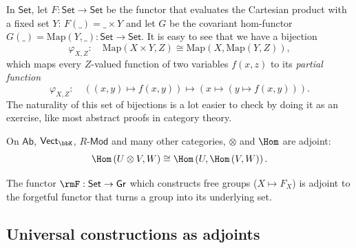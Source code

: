\begin{example}
In $\mathsf{Set}$, let $F:\mathsf{Set}\to\mathsf{Set}$ be the functor
that evaluates the Cartesian product with a fixed set $Y$: $F\left(\_\right)=\_\times Y$
and let $G$ be the covariant hom-functor $G\left(\_\right)=\mathrm{Map}\left(Y,\_\right):\mathsf{Set}\to\mathsf{Set}$.
It is easy to see that we have a bijection
\[
\varphi_{X,Z}:\quad\mathrm{Map}\left(X\times Y,Z\right)\cong\mathrm{Map}\left(X,\mathrm{Map}\left(Y,Z\right)\right),
\]
which maps every $Z$-valued function of two variables $f(x,z)$ to
its \emph{partial function}
\[
\varphi_{X,Z}:\quad\left(\left(x,y\right)\mapsto f(x,y)\right)\mapsto\left(x\mapsto\left(y\mapsto f\left(x,y\right)\right)\right).
\]
The naturality of this set of bijections is a lot easier to check
by doing it as an exercise, like most abstract proofs in category
theory.
\end{example}
%
\begin{example}\label{hom-functor adjoint}
On $\mathsf{Ab}$, $\mathsf{Vect}_{\bbK}$, $R\text{-}\mathsf{Mod}$
and many other categories, $\otimes$ and $\Hom$ are adjoint:
\[
\Hom\left(U\otimes V,W\right)\cong\Hom\left(U,\Hom\left(V,W\right)\right).
\]
\end{example}
%
\begin{example}
The functor $\rmF:\mathsf{Set}\to \mathsf{Gr}$ which constructs free groups ($X\mapsto F_X$) is adjoint to the forgetful functor that turns a group into its underlying set.
\end{example}




\subsection{Universal constructions as adjoints}

